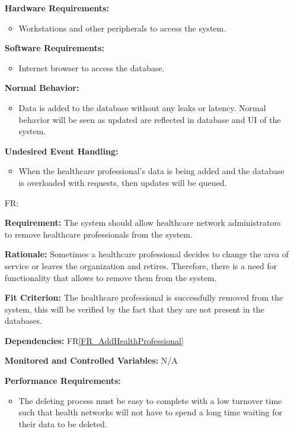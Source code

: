 \documentclass[12pt]{article}
\newcounter{reqnum} %
\begin{document}
\begin{itemize}
\textbf{Hardware Requirements:} 
\begin{itemize}
  \item Workstations and other peripherals to access the system.
\end{itemize}

\textbf{Software Requirements:} 
\begin{itemize}
  \item Internet browser to access the database.
\end{itemize}

\textbf{Normal Behavior:}
\begin{itemize}
  \item Data is added to the database without any leaks or latency. Normal behavior will be seen as updated are reflected in database and UI of the system.
\end{itemize} 

\textbf{Undesired Event Handling:}
\begin{itemize}
  \item When the healthcare professional’s data is being added and the database is overloaded with requests, then updates will be queued.
\end{itemize} 

\item[FR\refstepcounter{reqnum}\thereqnum \label{FR_RemoveHealthProfessionals}:] 

\textbf{Requirement:} The system should allow healthcare network administrators to remove healthcare professionals from the system. 

\textbf{Rationale:} Sometimes a healthcare professional decides to change the area of service or leaves the organization and retires. Therefore, there is a need for functionality that allows to remove them from the system.

\textbf{Fit Criterion:} The healthcare professional is successfully removed from the system, this will be verified by the fact that they are not present in the databases. 

\textbf{Dependencies:} FR\ref{FR_AddHealthProfessional}

\textbf{Monitored and Controlled Variables:} N/A

\textbf{Performance Requirements:}
\begin{itemize}
  \item The deleting process must be easy to complete with a low turnover time such that health networks will not have to spend a long time waiting for their data to be deleted.
\end{itemize} 


\end{itemize}
\end{document}
